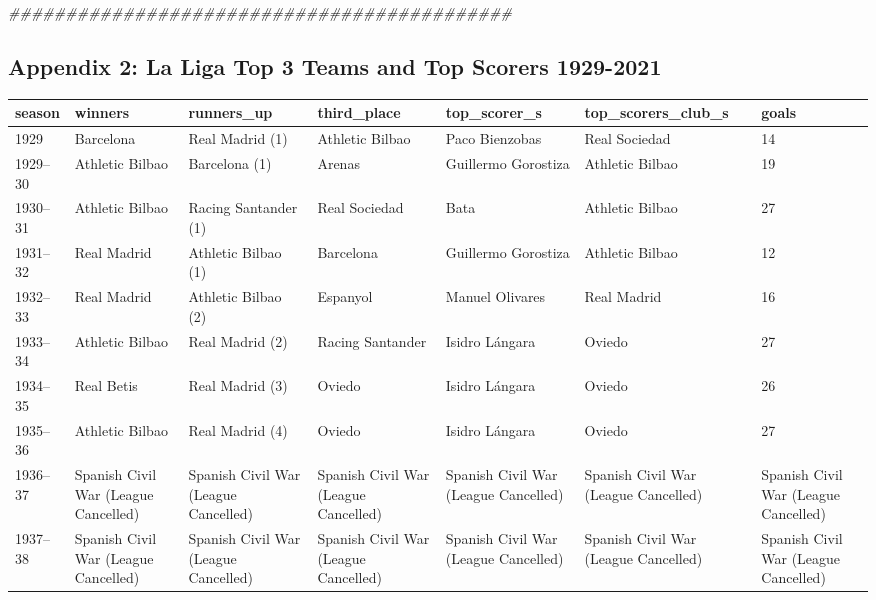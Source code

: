 \documentclass[]{tufte-handout}
\newenvironment{Shaded}{}{}
\newcommand{\DocumentationTok}[1]{\textcolor[rgb]{0.73,0.13,0.13}{\textit{#1}}}
\begin{document}
\begin{Shaded}
\begin{Highlighting}[]
\DocumentationTok{\#\#\#\#\#\#\#\#\#\#\#\#\#\#\#\#\#\#\#\#\#\#\#\#\#\#\#\#\#\#\#\#\#\#\#\#\#\#\#\#\#\#\#\#}
\end{Highlighting}
\end{Shaded}

\hypertarget{appendix-2-la-liga-top-3-teams-and-top-scorers-1929-2021}{%
\subsection{Appendix 2: La Liga Top 3 Teams and Top Scorers
1929-2021}\label{appendix-2-la-liga-top-3-teams-and-top-scorers-1929-2021}}

\begin{table}
\centering
\begin{tabular}{l|l|l|l|l|l|l}
\hline
season & winners & runners\_up & third\_place & top\_scorer\_s & top\_scorers\_club\_s & goals\\
\hline
1929 & Barcelona & Real Madrid (1) & Athletic Bilbao & Paco Bienzobas & Real Sociedad & 14\\
\hline
1929–30 & Athletic Bilbao & Barcelona (1) & Arenas & Guillermo Gorostiza & Athletic Bilbao & 19\\
\hline
1930–31 & Athletic Bilbao & Racing Santander (1) & Real Sociedad & Bata & Athletic Bilbao & 27\\
\hline
1931–32 & Real Madrid & Athletic Bilbao (1) & Barcelona & Guillermo Gorostiza & Athletic Bilbao & 12\\
\hline
1932–33 & Real Madrid & Athletic Bilbao (2) & Espanyol & Manuel Olivares & Real Madrid & 16\\
\hline
1933–34 & Athletic Bilbao & Real Madrid (2) & Racing Santander & Isidro Lángara & Oviedo & 27\\
\hline
1934–35 & Real Betis & Real Madrid (3) & Oviedo & Isidro Lángara & Oviedo & 26\\
\hline
1935–36 & Athletic Bilbao & Real Madrid (4) & Oviedo & Isidro Lángara & Oviedo & 27\\
\hline
1936–37 & Spanish Civil War (League Cancelled) & Spanish Civil War (League Cancelled) & Spanish Civil War (League Cancelled) & Spanish Civil War (League Cancelled) & Spanish Civil War (League Cancelled) & Spanish Civil War (League Cancelled)\\
\hline
1937–38 & Spanish Civil War (League Cancelled) & Spanish Civil War (League Cancelled) & Spanish Civil War (League Cancelled) & Spanish Civil War (League Cancelled) & Spanish Civil War (League Cancelled) & Spanish Civil War (League Cancelled)\\

\end{tabular}
\end{table}
\end{document}

